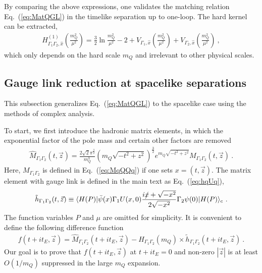 \documentclass[a4paper,11pt]{article}
\begin{document}
By comparing the above expressions, one validates the matching relation Eq.~(\ref{eq:MatQGL}) in the timelike separation up to one-loop. The hard kernel can be extracted,
\begin{align}
H^{(1)}_{\Gamma_1 \Gamma_2,\hat{x}}\left(\frac{m_{Q}^2} {\mu^2}\right) = \frac{3}{2}\ln \frac{m_Q^2}{\mu^2} - 2 + V_{\Gamma_1,\hat{x}}\left(\frac{m_Q^2}{\mu^2}\right) + V_{\Gamma_2,\hat{x}}\left(\frac{m_Q^2}{\mu^2}\right) \ ,
\end{align}
which only depends on the hard scale $m_Q$ and irrelevant to other physical scales. 

\subsection{Gauge link reduction at spacelike separations}\label{sec:reductionspace}
This subsection generalizes Eq.~(\ref{eq:MatQGL}) to the spacelike case using the methods of complex analysis. 

To start, we first introduce the hadronic matrix elements, in which the exponential factor of the pole mass and certain other factors are removed
\begin{align}\label{eq:hatM}
\hat M_{\Gamma_1\Gamma_2}(t,\vec{z})=\frac{2\sqrt{2}\pi^{\frac{3}{2}}}{m_Q^3}(m_Q\sqrt{-t^2+z^2})^{\frac{3}{2}}e^{m_Q\sqrt{-t^2+z^2}}M_{\Gamma_1\Gamma_2}(t,\vec{z}) \ . 
\end{align}
Here, $M_{\Gamma_1\Gamma_2}$ is defined in Eq.~(\ref{eq:MqQQq}) if one sets $x=\left(t,\vec{z}\right)$. The matrix element with gauge link is defined in the main text as Eq.~(\ref{eq:hqUq}),
\begin{align}
\tilde h_{\Gamma_1\Gamma_2}(t,\vec{z})\equiv   \langle H(P) | \bar{\psi}(x) \Gamma_1 U(x,0) \frac{i \slashed{x} + \sqrt{-x^2}}{2 \sqrt{-x^2}} \Gamma_2 \psi(0) | H(P) \rangle_c \ .  
\end{align}
The function variables $P$ and $\mu$ are omitted for simplicity. It is convenient to define the following difference function
\begin{align}
f(t+it_E,\vec{z})=\hat M_{\Gamma_1\Gamma_2}(t+it_E,\vec{z})- H_{\Gamma_1 \Gamma_2}(m_Q) \times  \tilde h_{\Gamma_1\Gamma_2}(t+it_E,\vec{z}) \ .
\end{align}
Our goal is to prove that $f(t+it_E,\vec{z})$ at $ t + i t_E = 0$ and non-zero $|\vec{z}|$ is at least $O\left(1/m_Q\right)$ suppressed in the large $m_Q$ expansion.
\end{document}
